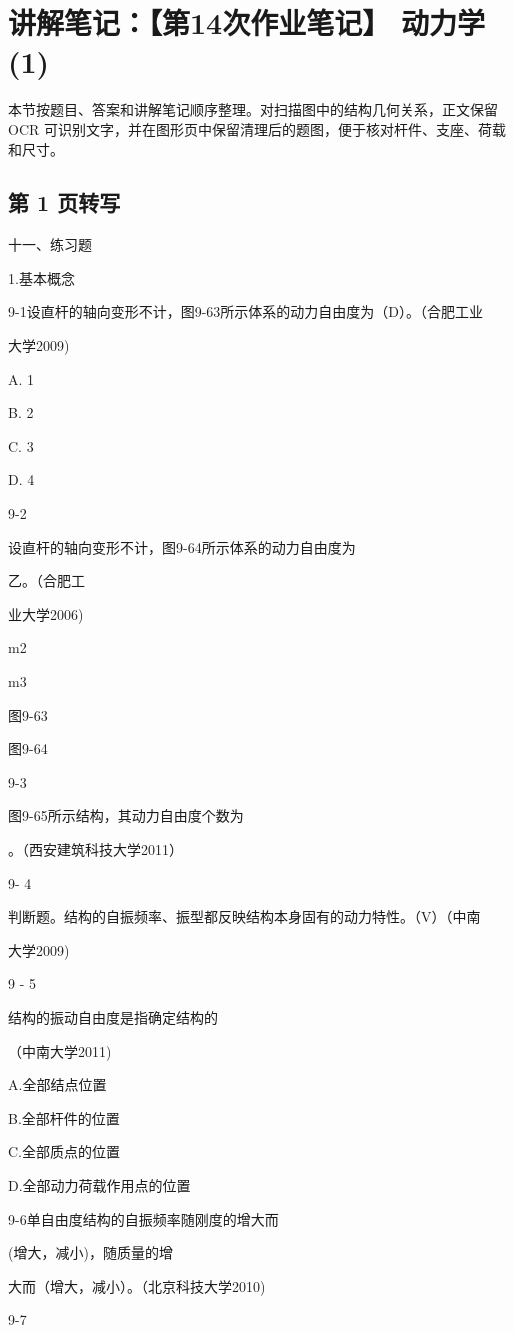 \section{讲解笔记：【第14次作业笔记】 动力学(1)}
\begin{analysisbox}
本节按题目、答案和讲解笔记顺序整理。对扫描图中的结构几何关系，正文保留 OCR 可识别文字，并在图形页中保留清理后的题图，便于核对杆件、支座、荷载和尺寸。
\end{analysisbox}
\subsection*{第 1 页转写}
十一、练习题

1.基本概念

9-1设直杆的轴向变形不计，图9-63所示体系的动力自由度为（D）。（合肥工业

大学2009)

A. 1

B. 2

C. 3

D. 4

9-2

设直杆的轴向变形不计，图9-64所示体系的动力自由度为

乙。（合肥工

业大学2006)

m2

m3

图9-63

图9-64

9-3

图9-65所示结构，其动力自由度个数为

。（西安建筑科技大学2011）

9- 4

判断题。结构的自振频率、振型都反映结构本身固有的动力特性。（V）（中南

大学2009)

9 - 5

结构的振动自由度是指确定结构的

（中南大学2011)

A.全部结点位置

B.全部杆件的位置

C.全部质点的位置

D.全部动力荷载作用点的位置

9-6单自由度结构的自振频率随刚度的增大而

(增大，减小)，随质量的增

大而（增大，减小）。（北京科技大学2010)

9-7

